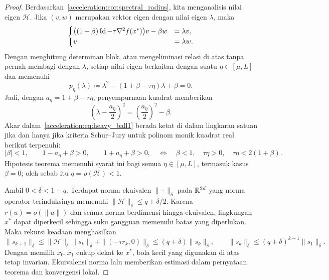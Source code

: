 \begin{proof}
    Berdasarkan~\cref{acceleration:cor:spectral_radius}, kita menganalisis nilai eigen \(\mathcal{H}\). Jika \((v,w)\) merupakan vektor eigen dengan nilai eigen \(\lambda\), maka
    \begin{equation}
        \begin{cases}
            \bigl((1+\beta)\operatorname{\mathrm{Id}}-\tau\nabla^2f(x^*)\bigr)v-\beta w
            &=\lambda v,\\
            v&=\lambda w.
        \end{cases}
    \end{equation}
    Dengan menghitung determinan blok, atau mengeliminasi relasi di atas tanpa pernah membagi dengan \(\lambda\), setiap nilai eigen berkaitan dengan suatu \(\eta\in[\mu,L]\) dan memenuhi
    \begin{equation}
        p_\eta(\lambda)
        \coloneqq\lambda^2-(1+\beta-\tau\eta)\lambda+\beta=0.
    \end{equation}
    Jadi, dengan \(a_\eta=1+\beta-\tau\eta\), penyempurnaan kuadrat memberikan
    \begin{equation}\label{acceleration:eq:heavy_ball1}
        \left(\lambda-\frac{a_\eta}{2}\right)^2
        =\left(\frac{a_\eta}{2}\right)^2-\beta.
    \end{equation}
    Akar dalam~\eqref{acceleration:eq:heavy_ball1} berada ketat di dalam lingkaran satuan jika dan hanya jika kriteria Schur--Jury untuk polinom monik kuadrat real berikut terpenuhi:
    \begin{equation}
        |\beta|<1,\qquad
        1-a_\eta+\beta>0,\qquad
        1+a_\eta+\beta>0,
        \quad\Longleftrightarrow\quad
        \beta<1,\quad\tau\eta>0,\quad
        \tau\eta<2(1+\beta).
    \end{equation}
    Hipotesis teorema memenuhi syarat ini bagi semua \(\eta\in[\mu,L]\), termasuk kasus \(\beta=0\); oleh sebab itu \(q=\rho(\mathcal{H})<1\).

    Ambil \(0<\delta<1-q\). Terdapat norma ekuivalen \(\|\cdot\|_\delta\) pada \(\mathbb{R}^{2d}\) yang norma operator terinduksinya memenuhi \(\|\mathcal{H}\|_\delta\leq q+\delta/2\). Karena \(r(u)=o(\|u\|)\) dan semua norma berdimensi hingga ekuivalen, lingkungan \(x^*\) dapat diperkecil sehingga suku gangguan memenuhi batas yang diperlukan. Maka rekursi keadaan menghasilkan
    \begin{equation}
        \|s_{k+1}\|_\delta
        \leq\|\mathcal{H}\|_\delta\|s_k\|_\delta
        +\|(-\tau r_k,0)\|_\delta
        \leq(q+\delta)\|s_k\|_\delta,
        \qquad
        \|s_k\|_\delta
        \leq(q+\delta)^{k-1}\|s_1\|_\delta.
    \end{equation}
    Dengan memilih \(x_0,x_1\) cukup dekat ke \(x^*\), bola kecil yang digunakan di atas tetap invarian. Ekuivalensi norma lalu memberikan estimasi dalam pernyataan teorema dan konvergensi lokal.


\end{proof}
